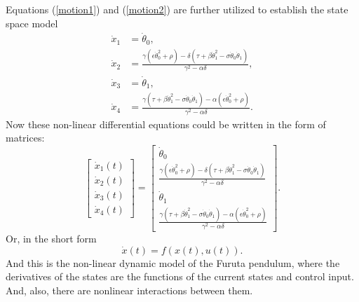 Equations (\ref{motion1}) and (\ref{motion2}) are further utilized to establish the state
space model
\begin{subequations}
	\begin{align}
	\dot{x}_1 &= \dot{\theta}_0, \\
	\dot{x}_2 &= \frac{\gamma(\epsilon\dot{\theta}_0^2+\rho)-\delta(\tau+\beta\dot{\theta}_1^2-\sigma\dot{\theta}_0\dot{\theta}_1)}{\gamma^2-\alpha\delta},\\
	\dot{x}_3 &= \dot{\theta}_1,\\
	\dot{x}_4 &= \frac{\gamma(\tau+\beta\dot{\theta}_1^2-\sigma\dot{\theta}_0\dot{\theta}_1)-\alpha(\epsilon\dot{\theta}_0^2+\rho)}{\gamma^2-\alpha\delta}.
	\end{align}
\end{subequations}
Now these non-linear differential equations could be written in the form of matrices:
\begin{equation}\label{nonlinmodel}
\begin{bmatrix}
\dot{x}_1(t) \\ \dot{x}_2(t) \\ \dot{x}_3(t) \\ \dot{x}_4(t)
\end{bmatrix} = \begin{bmatrix}
\dot{\theta}_0\\
\frac{\gamma(\epsilon\dot{\theta}_0^2+\rho)-\delta(\tau+\beta\dot{\theta}_1^2-\sigma\dot{\theta}_0\dot{\theta}_1)}{\gamma^2-\alpha\delta}\\
\dot{\theta}_1\\
\frac{\gamma(\tau+\beta\dot{\theta}_1^2-\sigma\dot{\theta}_0\dot{\theta}_1)-\alpha(\epsilon\dot{\theta}_0^2+\rho)}{\gamma^2-\alpha\delta}
\end{bmatrix}.
\end{equation}
Or, in the short form
\begin{equation} \dot{x}(t) = f(x(t),u(t)). \end{equation}
And this is the non-linear dynamic model of the Furuta pendulum, where the derivatives of the states are the functions of the current states and control input. And, also, there are nonlinear interactions between them. 
